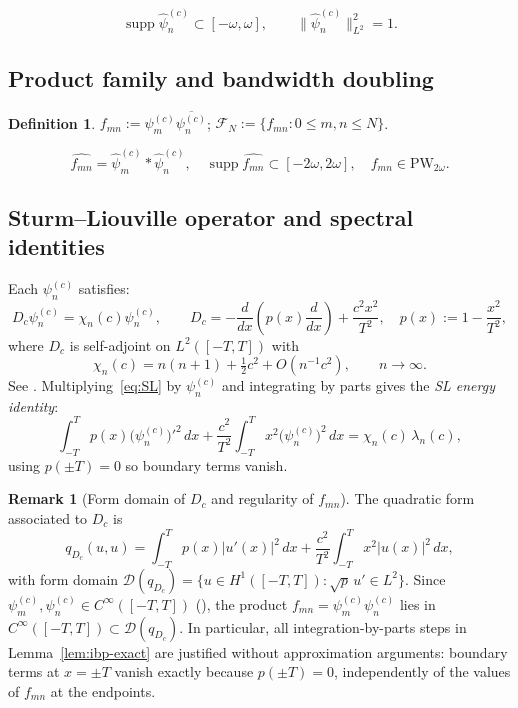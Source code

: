 \documentclass[12pt,a4paper]{amsart}
\theoremstyle{definition}
\newtheorem{definition}[theorem]{Definition}
\newtheorem{remark}[theorem]{Remark}
\newcommand{\psin}{\psi_n^{(c)}}
\newcommand{\FN}{\mathcal{F}_N}
\begin{document}
\begin{equation}\label{eq:bandlimited}
  \operatorname{supp}\hat\psin \subset [-\omega,\omega],
  \qquad \|\hat\psin\|_{L^2}^2 = 1.
\end{equation}

\subsection{Product family and bandwidth doubling}

\begin{definition}\label{def:product_family}
$f_{mn} := \psi_m^{(c)}\overline{\psin}$;
$\FN := \{f_{mn}: 0 \le m,n \le N\}$.
\end{definition}

\begin{equation}\label{eq:product_fourier}
  \widehat{f_{mn}} = \hat\psi_m^{(c)} * \hat\psin,
  \quad \operatorname{supp}\widehat{f_{mn}} \subset [-2\omega,2\omega],
  \quad f_{mn} \in \mathrm{PW}_{2\omega}.
\end{equation}

\subsection{Sturm--Liouville operator and spectral identities}\label{ssec:SL}

Each $\psin$ satisfies:
\begin{equation}\label{eq:SL}
  D_c\psin = \chi_n(c)\psin,
  \qquad D_c = -\frac{d}{dx}\!\left(p(x)\frac{d}{dx}\right) + \frac{c^2 x^2}{T^2},
  \quad p(x) := 1 - \frac{x^2}{T^2},
\end{equation}
where $D_c$ is self-adjoint on $L^2([-T,T])$ with
\begin{equation}\label{eq:chi-asym}
  \chi_n(c) = n(n+1) + \tfrac{1}{2}c^2 + O(n^{-1}c^2),
  \qquad n\to\infty.
\end{equation}
See \cite[Ch.~2]{OsipovRokhlinXiao}.
Multiplying~\eqref{eq:SL} by $\psin$ and integrating by parts gives
the \emph{SL energy identity}:
\begin{equation}\label{eq:SL-energy}
  \int_{-T}^T p(x)\bigl(\psi_n^{(c)}\bigr)'^2\,dx
  + \frac{c^2}{T^2}\int_{-T}^T x^2\bigl(\psin\bigr)^2\,dx
  = \chi_n(c)\,\lambda_n(c),
\end{equation}
using $p(\pm T) = 0$ so boundary terms vanish.

\begin{remark}[Form domain of $D_c$ and regularity of $f_{mn}$]
\label{rem:form-domain}
The quadratic form associated to $D_c$ is
\[
  q_{D_c}(u,u)
  = \int_{-T}^T p(x)|u'(x)|^2\,dx
  + \frac{c^2}{T^2}\int_{-T}^T x^2|u(x)|^2\,dx,
\]
with form domain $\mathcal{D}(q_{D_c})
= \{u \in H^1([-T,T]) : \sqrt{p}\,u' \in L^2\}$.
Since $\psi_m^{(c)}, \psin \in C^\infty([-T,T])$
(\cite[Ch.~2, Thm.~2.1]{OsipovRokhlinXiao}),
the product $f_{mn} = \psi_m^{(c)}\psin$ lies in
$C^\infty([-T,T]) \subset \mathcal{D}(q_{D_c})$.
In particular, all integration-by-parts steps in
Lemma~\ref{lem:ibp-exact} are justified without approximation
arguments: boundary terms at $x = \pm T$ vanish exactly because
$p(\pm T) = 0$, independently of the values of $f_{mn}$ at the
endpoints.
\end{remark}
\end{document}
